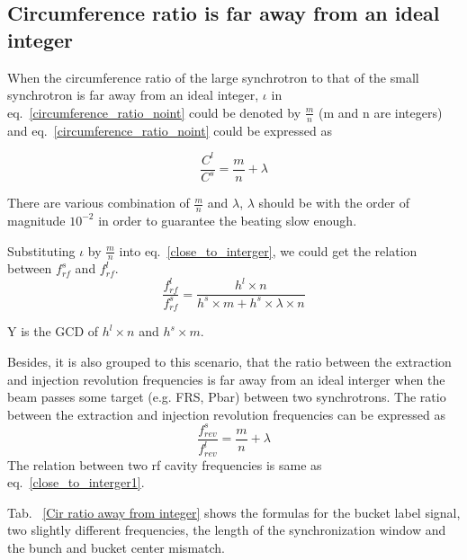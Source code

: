 \subsection{Circumference ratio is far away from an ideal integer} 
When the circumference ratio of the large synchrotron to that of the small synchrotron is far away from an ideal integer, $\iota$ in eq.~\ref{circumference_ratio_noint} could be denoted by $\frac{m}{n}$ (m and n are integers) and eq.~\ref{circumference_ratio_noint} could be expressed as

\begin{equation}
\frac{C^l}{C^s}=\frac{m}{n}+ \lambda \label{circumference_ratio_noint1}
\end{equation}

There are various combination of $\frac{m}{n}$ and $\lambda$, $\lambda$ should be with the order of magnitude $10^{-2}$ in order to guarantee the beating slow enough.


Substituting $\iota$ by $\frac{m}{n}$ into eq.~\ref{close_to_interger}, we could get the relation between $f_{rf}^{s}$ and $f_{rf}^{l}$.
\begin{equation} 
\frac{f_{rf}^{l}}{f_{rf}^{s}}=\frac{h^l\times n}{h^s \times m+ h^s \times\lambda\times n}\label{close_to_interger1}
\end{equation}

Y is the GCD of $h^l\times n$ and $h^s \times m$.


Besides, it is also grouped to this scenario, that the ratio between the extraction and injection revolution frequencies is far away from an ideal interger when the beam passes some target (e.g. FRS, Pbar) between two synchrotrons. The ratio between the extraction and injection revolution frequencies can be expressed as
\begin{equation} 
\frac{f_{rev}^{s}}{f_{rev}^{l}}=\frac{m}{n}+ \lambda\label{close_to_interger2}
\end{equation}
The relation between two rf cavity frequencies is same as eq.~\ref{close_to_interger1}.

Tab. ~\ref{Cir ratio away from integer} shows the formulas for the bucket label signal, two slightly different frequencies, the length of the synchronization window and the bunch and bucket center mismatch.

